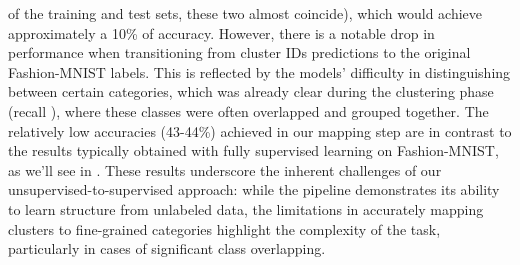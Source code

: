of the training and test sets, these two almost coincide), which would achieve approximately a 10\% of accuracy. However, there is a notable drop
in performance when transitioning from cluster IDs predictions to the original Fashion-MNIST labels. This is reflected by the 
models’ difficulty in distinguishing between certain categories, which was already clear during the clustering phase 
(recall ), where these classes were often overlapped and grouped together. 
The relatively low accuracies (43-44\%) achieved in our mapping step are in contrast to the results typically obtained 
with fully supervised learning on Fashion-MNIST, as we'll see in . These results underscore the inherent 
challenges of our unsupervised-to-supervised approach: while the pipeline demonstrates its ability to learn structure from unlabeled data, 
the limitations in accurately mapping clusters to fine-grained categories highlight the complexity of the task, particularly in cases 
of significant class overlapping.
\newpage